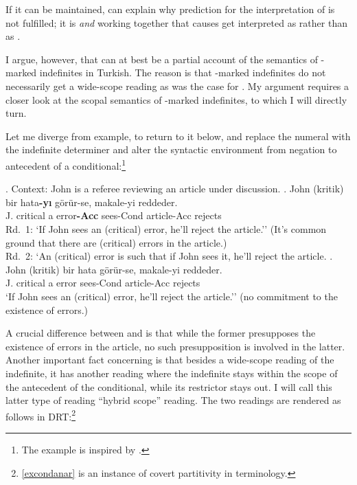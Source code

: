 \documentclass[11pt,a4paper]{article}
\begin{document}
If it can be maintained,  can explain why
 prediction for the interpretation of 
is not fulfilled; it is   \emph{and}
 working together that causes
 get interpreted as  rather than as
.

I argue, however, that  can at best be a partial account
of the semantics of \acc-marked indefinites in Turkish. The reason is
that \acc-marked indefinites do not necessarily get a wide-scope
reading as was the case for . My argument
requires a closer look at the scopal semantics of \acc-marked
indefinites, to which I will directly turn. 

Let me diverge from  example, to return to it below, and
replace the numeral  with the indefinite determiner
 and alter the syntactic environment from negation
to antecedent of a conditional:\footnote{The example is inspired by
.}


\ex.\label{excond}%
Context: John is a referee reviewing an article under discussion.
\ag.\label{exconda}%
	John (kritik) bir hata{\bf-yı} görür-se, makale-yi reddeder.\\
	J. critical a error{\bf-Acc} sees-Cond article-Acc rejects\\
	Rd.\ 1: `If John sees an (critical) error, he'll reject the article.'' (It's
	common ground that there are (critical) errors in the article.)\\
	Rd.\ 2: `An (critical) error is such that if John sees it, he'll reject the
	article.
\bg.\label{excondz}%
	John (kritik) bir hata görür-se, makale-yi reddeder.\\
	J. critical a error sees-Cond article-Acc rejects\\
	`If John sees an (critical) error, he'll reject the article.'' (no commitment
	to the existence of errors.)


A crucial difference between  and  is that
while the former presupposes the existence of errors in the article,
no such presupposition is involved in the latter. Another important
fact concerning  is that besides a wide-scope reading of
the indefinite, it has another reading where the indefinite stays
within the scope of the antecedent of the conditional, while its
restrictor stays out. I will call this latter type of reading ``hybrid
scope'' reading. The two readings are rendered as follows in
DRT:\footnote{\ref{excondanar} is an instance of covert partitivity in
 terminology.}
\end{document}
